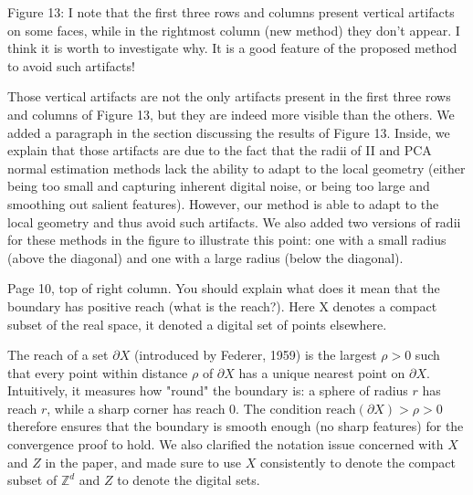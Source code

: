 \documentclass[10pt,french]{letter}
\begin{document}
  \begin{remark}
    Figure 13: I note that the first three rows and columns present vertical artifacts on some faces,
    while in the rightmost column (new method) they don’t appear. I think it is worth to investigate
    why. It is a good feature of the proposed method to avoid such artifacts!
  \end{remark}
  \begin{response}
    Those vertical artifacts are not the only artifacts present in the first three rows and columns
    of Figure 13, but they are indeed more visible than the others. We added a paragraph in the
    section discussing the results of Figure 13. Inside, we explain that those artifacts are due to the fact that
    the radii of II and PCA normal estimation methods lack the ability to adapt to the local geometry (either
    being too small and capturing inherent digital noise, or being too large and smoothing out salient features).
    However, our method is able to adapt to the local geometry and thus avoid such artifacts. We also added two
    versions of radii for these methods in the figure to illustrate this point: one with a small radius (above
    the diagonal) and one with a large radius (below the diagonal).
  \end{response}

  \begin{remark}
    Page 10, top of right column. You should explain what does it mean that the boundary has
    positive reach (what is the reach?). Here X denotes a compact subset of the real space, it
    denoted a digital set of points elsewhere.
  \end{remark}
  \begin{response}
    The reach of a set $\partial X$ (introduced by Federer, 1959) is the largest $\rho > 0$
    such that every point within distance $\rho$ of $\partial X$ has a unique nearest point on
    $\partial X$. Intuitively, it measures how "round" the boundary is: a sphere of radius $r$
    has reach $r$, while a sharp corner has reach $0$. The condition $\mathrm{reach}(\partial X) > \rho > 0$
    therefore ensures that the boundary is smooth enough (no sharp features) for the convergence
    proof to hold.
    We also clarified the notation issue concerned with $X$ and $Z$ in the paper,
    and made sure to use $X$ consistently to denote the compact subset of $\mathbb{Z}^d$ and $Z$ to
    denote the digital sets.
  \end{response}
\end{document}
